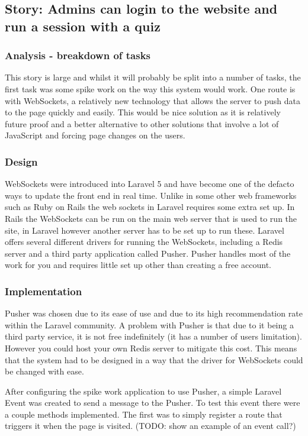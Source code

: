 \subsection{Story: Admins can login to the website and run a session with a quiz}
\subsubsection{Analysis - breakdown of tasks}
This story is large and whilst it will probably be split into a number of tasks, the first task was some spike work on the way this system would work. One route is with WebSockets, a relatively new technology that allows the server to push data to the page quickly and easily\cite{websockets}. This would be nice solution as it is relatively future proof and a better alternative to other solutions that involve a lot of JavaScript and forcing page changes on the users.
\subsubsection{Design}
WebSockets were introduced into Laravel 5 and have become one of the defacto ways to update the front end in real time. Unlike in some other web frameworks such as Ruby on Rails the web sockets in Laravel requires some extra set up. In Rails the WebSockets can be run on the main web server that is used to run the site\cite{rails-websockets}, in Laravel however another server has to be set up to run these. Laravel offers several different drivers for running the WebSockets, including a Redis server and a third party application called Pusher\cite{laravel-broadcasting}. Pusher handles most of the work for you and requires little set up other than creating a free account\cite{pusher-what-is}.
\subsubsection{Implementation}
Pusher was chosen due to its ease of use and due to its high recommendation rate within the Laravel community. A problem with Pusher is that due to it being a third party service, it is not free indefinitely (it has a number of users limitation). However you could host your own Redis server to mitigate this cost. This means that the system had to be designed in a way that the driver for WebSockets could be changed with ease.

After configuring the spike work application to use Pusher, a simple Laravel Event was created to send a message to the Pusher. To test this event there were a couple methods implemented. The first was to simply register a route that triggers it when the page is visited. (TODO: show an example of an event call?)
 

